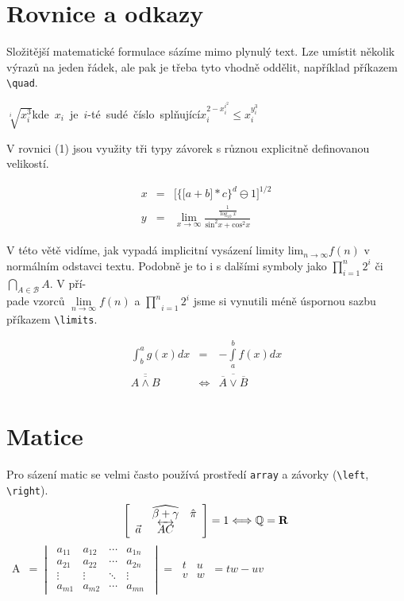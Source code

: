 \documentclass[11pt,a4paper,twocolumn]{article}
\begin{document}
\begin{twocolumn}
		\section{Rovnice a odkazy}
		Složitější matematické formulace sázíme mimo plynulý text. Lze umístit několik výrazů na jeden řádek, ale pak je třeba tyto vhodně oddělit, například příkazem \verb|\quad|. \\ \medskip
		
		\noindent\mbox{$\sqrt[i]{x^3_i}$\quad kde $x_{i}$ je $i$-té sudé číslo splňující\quad$x^{2-x^{i^{2}}_{i}}_{i}\leq x^{y^{3}_{i}}_{i}$}\vspace{0.4em}
		
		V rovnici (1) jsou využity tři typy závorek s různou explicitně definovanou velikostí.
		
		\begin{eqnarray}\label{rovnice}
		x &= & \bigg[\Big\{\big[a + b\big] * c \Big\}^d \ominus 1 \bigg]^{1/2}  \\	
		y &= & \lim\limits_{x \to \infty} \frac{\frac{1}{\log_{10} x}}{\mathrm{sin}^2x + \mathrm{cos}^2x} \nonumber		
		\end{eqnarray}
		
		V této větě vidíme, jak vypadá implicitní vysázení limity $\mathrm{lim}_{n \to \infty} f(n)$ v normálním odstavci textu. Podobně je to i s dalšími symboly jako $\prod^{n}_{i=1} 2^{i}$ či $\bigcap_{A\in \mathcal{B}}A$. V pří-\\pade vzorců $\lim\limits_{n \to \infty}f(n)$ a $\underset{i=1}{\overset{n}{\prod}} 2^{i}$ jsme si vynutili méně úspornou sazbu příkazem \verb|\limits|.
		
		\begin{eqnarray}
			\int _b^ag(x)dx &= & -\int\limits _a^bf(x)dx \\
			\overline{\overline{A \wedge B}} &\Leftrightarrow & \overline{\overline{A} \vee \overline{B}}
		\end{eqnarray}
	
		\section{Matice}
		Pro sázení matic se velmi často používá prostředí \verb|array| a závorky (\verb|\left|, \verb|\right|).
		$$\left[
		\begin{array}{c c c}
			&\widehat{\beta + \gamma} & \hat{\pi}\\
			\vec{a}&\overleftrightarrow{AC}
		\end{array}
		\right] = 1 \Longleftrightarrow \mathbb{Q} = \mathbf{R}$$
		\mbox{
		A $= \begin{vmatrix}
		\ a_{11} & a_{12} & \cdots & a_{1n}\ \\
		\ a_{21} & a_{22} & \cdots & a_{2n}\ \\
		\ \vdots & \vdots & \ddots & \vdots\ \\
		\ a_{m1} & a_{m2} & \cdots & a_{mn}\ 
		\end{vmatrix}
		= \begin{matrix}
		\ t & u \  \\
		\ v & w \ 
		\end{matrix}
		= tw - uv$
	} \\


\end{twocolumn}
\end{document}

